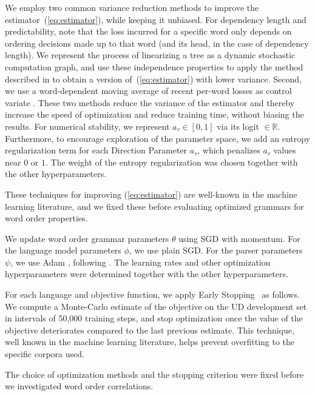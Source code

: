 \documentclass[12pt]{article}
\begin{document}
We employ two common variance reduction methods to improve the estimator~(\ref{eq:estimator}), while keeping it unbiased.
For dependency length and predictability, note that the loss incurred for a specific word only depends on ordering decisions made up to that word (and its head, in the case of dependency length). We represent the process of linearizing a tree as a dynamic stochastic computation graph, and use these independence properties to apply the method described in \citet{schulman2015gradient} to obtain a version of~(\ref{eq:estimator}) with lower variance.
Second, we use a word-dependent moving average of recent per-word losses as control variate \cite{williams1992simple}.
These two methods reduce the variance of the estimator and thereby increase the speed of optimization and reduce training time, without biasing the results.
For numerical stability, we represent $a_\tau \in [0,1]$ via its logit $\in \mathbb{R}$.
Furthermore, to encourage exploration of the parameter space, we add an entropy regularization term \citep{xu2015show} for each Direction Parameter $a_\tau$, which penalizes $a_\tau$ values near $0$ or $1$. The weight of the entropy regularization was chosen together with the other hyperparameters.


These techniques for improving (\ref{eq:estimator}) are well-known in the machine learning literature, and we fixed these before evaluating optimized grammars for word order properties.

We update word order grammar parameters $\theta$ using SGD with momentum.
For the language model parameters $\phi$, we use plain SGD. 
For the parser parameters $\psi$, we use Adam \citep{kingma2014adam}, following \citet{dozat2017stanford}.
The learning rates and other optimization hyperparameters were determined together with the other hyperparameters.

For each language and objective function, we apply Early Stopping~\citep{prechelt1998early} as follows. We compute a Monte-Carlo estimate of the objective on the UD development set in intervals of 50,000 training steps, and stop optimization once the value of the objective deteriorates compared to the last previous estimate. This technique, well known in the machine learning literature, helps prevent overfitting to the specific corpora used.

The choice of optimization methods and the stopping criterion were fixed before we investigated word order correlations.
\end{document}
